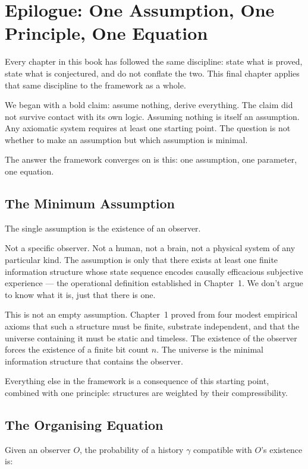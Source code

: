 \chapter{Epilogue: One Assumption, One Principle, One Equation}

Every chapter in this book has followed the same discipline: state what
is proved, state what is conjectured, and do not conflate the two. This
final chapter applies that same discipline to the framework as a whole.

We began with a bold claim: assume nothing, derive everything. The claim
did not survive contact with its own logic. Assuming nothing is itself
an assumption. Any axiomatic system requires at least one starting
point. The question is not whether to make an assumption but which
assumption is minimal.

The answer the framework converges on is this: one assumption, one
parameter, one equation.

\section{The Minimum Assumption}

The single assumption is the existence of an observer.

Not a specific observer. Not a human, not a brain, not a physical
system of any particular kind. The assumption is only that there exists
at least one finite information structure whose state sequence encodes
causally efficacious subjective experience --- the operational
definition established in Chapter~1. We don't argue to know what it is,
just that there is one.

This is not an empty assumption. Chapter~1 proved from four modest
empirical axioms that such a structure must be finite, substrate
independent, and that the universe containing it must be static and
timeless. The existence of the observer forces the existence of a finite
bit count $n$. The universe is the minimal information structure that
contains the observer.

Everything else in the framework is a consequence of this starting
point, combined with one principle: structures are weighted by their
compressibility.

\section{The Organising Equation}

Given an observer $O$, the probability of a history $\gamma$ compatible
with $O$'s existence is:

